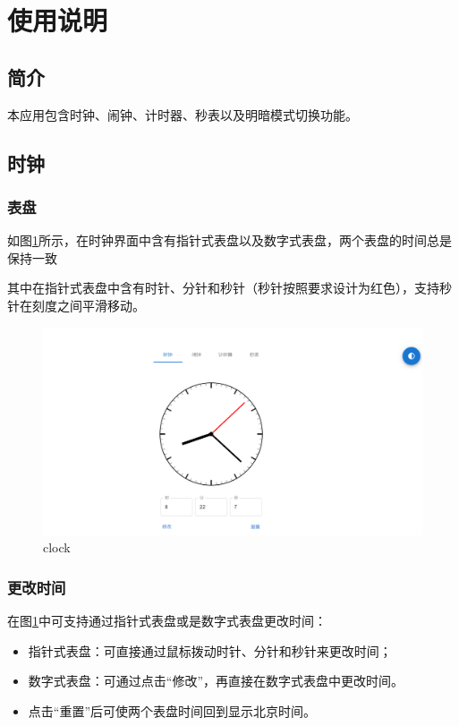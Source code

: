 \documentclass[a4paper,11pt]{article}
\begin{document}
\section{使用说明}
\subsection{简介}
本应用包含时钟、闹钟、计时器、秒表以及明暗模式切换功能。

\subsection{时钟}
\subsubsection{表盘}
如图\ref{fig:clock}所示，在时钟界面中含有指针式表盘以及数字式表盘，两个表盘的时间总是保持一致

其中在指针式表盘中含有时针、分针和秒针（秒针按照要求设计为红色），支持秒针在刻度之间平滑移动。
\begin{figure}[!h]
    \centering
    \begin{minipage}{0.7\textwidth}
        \centering
        \includegraphics[width=\linewidth]{image/clock.png}
        \caption{clock}
            \label{fig:clock}
    \end{minipage}
\end{figure}
\subsubsection{更改时间}
在图\ref{fig:clock}中可支持通过指针式表盘或是数字式表盘更改时间：
\begin{itemize}
  \item 指针式表盘：可直接通过鼠标拨动时针、分针和秒针来更改时间；
  \item 数字式表盘：可通过点击“修改”，再直接在数字式表盘中更改时间。
  \item 点击“重置”后可使两个表盘时间回到显示北京时间。
\end{itemize}
\end{document}
